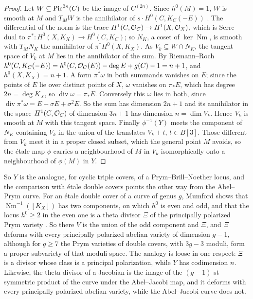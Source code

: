 \begin{proof}
Let $W\subseteq\operatorname{Pic}^{2n}(C)$ be the image of $C^{(2n)}$. Since $h^{0}(M)=1$,
$W$ is smooth at $M$ and $T_{M}W$ is the annihilator of $s\cdot
H^{0}(C,K_{C}(-E))$ \cite[Chapter~IV]{ACGH85}. The differential of the norm
is the trace $H^{1}(C,\mathcal{O}_{C})\to H^{1}(X,\mathcal{O}_{X})$, which is Serre dual to
$\pi^{*}\colon H^{0}(X,K_{X})\to H^{0}(C,K_{C})$; so $N_{K}$, a coset of
$\ker\operatorname{Nm}$, is smooth with $T_{M}N_{K}$ the annihilator of
$\pi^{*}H^{0}(X,K_{X})$. As $V_{k}\subseteq W\cap N_{K}$, the tangent space of
$V_{k}$ at $M$ lies in the annihilator of the sum. By Riemann--Roch
$h^{0}(C,K_{C}(-E))=h^{0}(C,\mathcal{O}_{C}(E))-\deg E+g(C)-1=n+1$, and
$h^{0}(X,K_{X})=n+1$. A form $\pi^{*}\omega$ in both summands vanishes on
$E$; since the points of $E$ lie over distinct points of $X$, $\omega$
vanishes on $\pi_{*}E$, which has degree $2n=\deg K_{X}$, so
$\operatorname{div}\omega=\pi_{*}E$. Conversely this $\omega$ lies in both,
since $\operatorname{div}\pi^{*}\omega=E+\sigma E+\sigma^{2}E$. So the sum has
dimension $2n+1$ and its annihilator in the space $H^{1}(C,\mathcal{O}_{C})$ of
dimension $3n+1$ has dimension $n=\dim V_{k}$. Hence $V_{k}$ is smooth at $M$
with this tangent space. Finally $\phi^{-1}(Y)$ meets the component of
$N_{K}$ containing $V_{k}$ in the union of the translates $V_{k}+t$, $t\in
B[3]$. Those different from $V_{k}$ meet it in a proper closed subset, which
the general point $M$ avoids, so the \'etale map $\phi$ carries a
neighbourhood of $M$ in $V_{k}$ isomorphically onto a neighbourhood of
$\phi(M)$ in $Y$.
\end{proof}

So $Y$ is the analogue, for cyclic triple covers, of a Prym--Brill--Noether
locus, and the comparison with \'etale double covers points the other way
from the Abel--Prym curve. For an \'etale double cover of a curve of genus
$g$, Mumford shows that $\operatorname{Nm}^{-1}([K_{X}])$ has two
components, on which $h^{0}$ is even and odd, and that the locus $h^{0}\ge2$
in the even one is a theta divisor $\Xi$ of the principally polarized Prym
variety \cite{Mum74}. So there $V$ is the union of the odd component and
$\Xi$, and $\Xi$ deforms
with every principally polarized abelian variety of dimension $g-1$,
although for $g\ge7$ the Prym varieties of double covers, with $3g-3$
moduli, form a proper subvariety of that moduli space. The analogy is loose
in one respect: $\Xi$ is a divisor whose class is a principal polarization,
while $Y$ has codimension $n$. Likewise, the theta divisor of a Jacobian is
the image of the $(g-1)$-st symmetric product of the curve under the
Abel--Jacobi map, and it deforms with every principally polarized abelian
variety, while the Abel--Jacobi curve does not.

